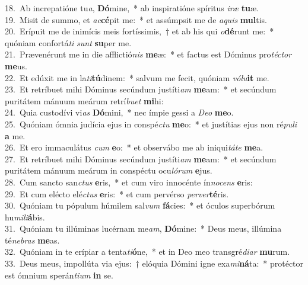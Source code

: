 {18.~}Ab increpatióne tu\textit{a}, \textbf{Dó}mine,~* ab inspiratióne spíritus \textit{i}\textit{ræ} \textbf{tu}æ.\\
{19.~}Misit de summo, et \textit{ac}\textbf{cé}pit me:~* et assúmpsit me de \textit{a}\textit{quis} \textbf{mul}tis.\\
{20.~}Erípuit me de inimícis meis fortíssimis,~† et ab his qui \textit{o}\textbf{dé}runt me:~* quóniam confortá\textit{ti} \textit{sunt} \textbf{su}per me.\\
{21.~}Prævenérunt me in die afflictió\textit{nis} \textbf{me}æ:~* et factus est Dóminus pro\textit{té}\textit{ctor} \textbf{me}us.\\
{22.~}Et edúxit me in la\textit{ti}\textbf{tú}dinem:~* salvum me fecit, quóniam \textit{vó}\textit{lu}\textbf{it} me.\\
{23.~}Et retríbuet mihi Dóminus secúndum justíti\textit{am} \textbf{me}am:~* et secúndum puritátem mánuum meárum retrí\textit{bu}\textit{et} \textbf{mi}hi:\\
{24.~}Quia custodívi vi\textit{as} \textbf{Dó}mini,~* nec ímpie gessi a \textit{De}\textit{o} \textbf{me}o.\\
{25.~}Quóniam ómnia judícia ejus in conspé\textit{ctu} \textbf{me}o:~* et justítias ejus non ré\textit{pu}\textit{li} \textbf{a} me.\\
{26.~}Et ero immaculátus \textit{cum} \textbf{e}o:~* et observábo me ab iniqui\textit{tá}\textit{te} \textbf{me}a.\\
{27.~}Et retríbuet mihi Dóminus secúndum justíti\textit{am} \textbf{me}am:~* et secúndum puritátem mánuum meárum in conspéctu ocu\textit{ló}\textit{rum} \textbf{e}jus.\\
{28.~}Cum sancto san\textit{ctus} \textbf{e}ris,~* et cum viro innocénte ín\textit{no}\textit{cens} \textbf{e}ris:\\
{29.~}Et cum elécto elé\textit{ctus} \textbf{e}ris:~* et cum pervérso \textit{per}\textit{ver}\textbf{té}ris.\\
{30.~}Quóniam tu pópulum húmilem sal\textit{vum} \textbf{fá}cies:~* et óculos superbórum hu\textit{mi}\textit{li}\textbf{á}bis.\\
{31.~}Quóniam tu illúminas lucérnam me\textit{am}, \textbf{Dó}mine:~* Deus meus, illúmina té\textit{ne}\textit{bras} \textbf{me}as.\\
{32.~}Quóniam in te erípiar a tenta\textit{ti}\textbf{ó}ne,~* et in Deo meo transgré\textit{di}\textit{ar} \textbf{mu}rum.\\
{33.~}Deus meus, impollúta via ejus:~† elóquia Dómini igne exa\textit{mi}\textbf{ná}ta:~* protéctor est ómnium sperán\textit{ti}\textit{um} \textbf{in} se.\\
